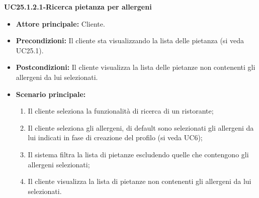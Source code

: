 \textbf{UC25.1.2.1-Ricerca pietanza per allergeni}
\begin{itemize}
\item \textbf{Attore principale:} Cliente.
\item \textbf{Precondizioni:}  Il cliente sta visualizzando la lista delle pietanza (si veda UC25.1).
\item \textbf{Postcondizioni:} Il cliente visualizza la lista delle pietanze non contenenti gli allergeni da lui selezionati.
\item \textbf{Scenario principale:}
\begin{enumerate}
    \item Il cliente seleziona la funzionalità di ricerca di un ristorante;
    \item Il cliente seleziona gli allergeni, di default sono selezionati gli allergeni da lui indicati in fase di creazione del profilo (si veda UC6);
    \item Il sistema filtra la lista di pietanze escludendo quelle che contengono gli allergeni selezionati;
    \item Il cliente visualizza la lista di pietanze non contenenti gli allergeni da lui selezionati.
\end{enumerate}
\end{itemize}

